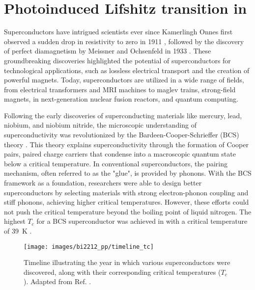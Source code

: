\chapter{Photoinduced Lifshitz transition in }
\label{ch:bi2212}

Superconductors have intrigued scientists ever since Kamerlingh Onnes first observed a sudden drop in resistivity to zero in 1911 \cite{van_delft_discovery_2010}, followed by the discovery of perfect diamagnetism by Meissner and Ochsenfeld in 1933 \cite{meissner_neuer_1933}.
These groundbreaking discoveries highlighted the potential of superconductors for technological applications, such as lossless electrical transport and the creation of powerful magnets.
Today, superconductors are utilized in a wide range of fields, from electrical transformers and MRI machines to maglev trains, strong-field magnets, in next-generation nuclear fusion reactors, and quantum computing.

Following the early discoveries of superconducting materials like mercury, lead, niobium, and niobium nitride, the microscopic understanding of superconductivity was revolutionized by the Bardeen-Cooper-Schrieffer (BCS) theory \cite{bardeen_theory_1957}.
This theory explains superconductivity through the formation of Cooper pairs, paired charge carriers that condense into a macroscopic quantum state below a critical temperature.
In conventional superconductors, the pairing mechanism, often referred to as the "glue", is provided by phonons.
With the BCS framework as a foundation, researchers were able to design better superconductors by selecting materials with strong electron-phonon coupling and stiff phonons, achieving higher critical temperatures.
However, these efforts could not push the critical temperature beyond the boiling point of liquid nitrogen.
The highest $T_c$ for a BCS superconductor was achieved in  with a critical temperature of \qty{39}{\kelvin} \cite{nagamatsu_superconductivity_2001}.

\begin{figure}
	\centering
	\texttt{[image: images/bi2212\_pp/timeline\_tc]}
	\caption{Timeline illustrating the year in which various superconductors were discovered, along with their corresponding critical temperatures ($T_c$). Adapted from Ref. \cite{pjray_english_2015}.}
	\label{fig:timeline}
\end{figure}

